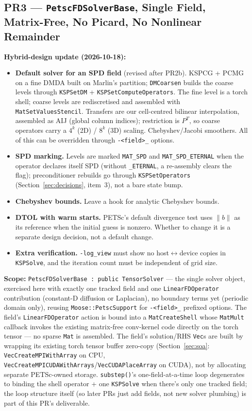 \documentclass[11pt]{article}
\newcommand{\pr}[2]{\subsection{PR#1 --- #2}}
\begin{document}
\pr{3}{\texttt{PetscFDSolverBase}, Single Field, Matrix-Free, No Picard, No Nonlinear Remainder}
\textbf{Hybrid-design update (2026-10-18):}
\begin{itemize}[leftmargin=*]
\item \textbf{Default solver for an SPD field} (revised after PR2b). KSPCG +
PCMG on a fine DMDA built on Marlin's partition; \texttt{DMCoarsen} builds the
coarse levels through \texttt{KSPSetDM} + \texttt{KSPSetComputeOperators}. The
fine level is a torch shell; coarse levels are rediscretised and assembled with
\texttt{MatSetValuesStencil}. Transfers are our cell-centred bilinear
interpolation, assembled as AIJ (global column indices); restriction is $P^T$, so
coarse operators carry a $4^k$ (2D) / $8^k$ (3D) scaling. Chebyshev/Jacobi
smoothers. All of this can be overridden through \texttt{-<field>\_} options.
\item \textbf{SPD marking.} Levels are marked \texttt{MAT\_SPD} and \texttt{MAT\_SPD\_ETERNAL} when the
operator declares itself SPD (without \texttt{\_ETERNAL}, a re-assembly
clears the flag); preconditioner rebuilds go through \texttt{KSPSetOperators}
(Section~\ref{sec:decisions}, item~3), not a bare state bump.
\item \textbf{Chebyshev bounds.} Leave a hook for analytic Chebyshev bounds.
\item \textbf{DTOL with warm starts.} PETSc's default divergence test uses
$\|b\|$ as its reference when the initial guess is nonzero. Whether to
change it is a separate design decision, not a default change.
\item \textbf{Extra verification.} \texttt{-log\_view} must show no
host$\leftrightarrow$device copies in \texttt{KSPSolve}, and the iteration
count must be independent of grid size.
\end{itemize}

\textbf{Scope:} \texttt{PetscFDSolverBase : public TensorSolver} --- the
single solver object, exercised here with exactly one tracked field and one
\texttt{LinearFDOperator} contribution (constant-D diffusion or Laplacian),
no boundary terms yet (periodic domain only), reusing
\texttt{Moose::PetscSupport} for \texttt{-<field>\_} prefixed options. The
field's \texttt{LinearFDOperator} action is bound into a
\texttt{MatCreateShell} whose \texttt{MatMult} callback invokes the existing
matrix-free conv-kernel code directly on the torch tensor --- no sparse
\texttt{Mat} is assembled. The field's solution/RHS \texttt{Vec}s are built
by wrapping its existing torch tensor buffer zero-copy
(Section~\ref{sec:soa}: \texttt{VecCreateMPIWithArray} on CPU,
\texttt{VecCreateMPICUDAWithArrays}/\texttt{VecCUDAPlaceArray} on CUDA), not
by allocating separate PETSc-owned storage. \texttt{substep()}'s
one-field-at-a-time loop degenerates to binding the shell operator + one
\texttt{KSPSolve} when there's only one tracked field; the loop structure
itself (so later PRs just add fields, not new solver plumbing) is part of
this PR's deliverable.
\end{document}

